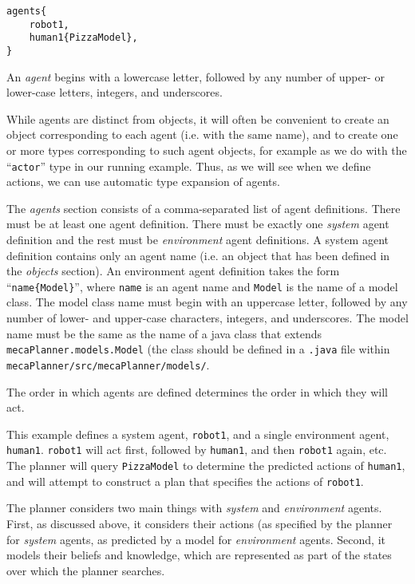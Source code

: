 \documentclass{article}
\begin{document}
\begin{verbatim}
agents{
    robot1,
    human1{PizzaModel},
}
\end{verbatim}


An \emph{agent}
begins with a lowercase letter, followed by any number of upper-
or lower-case letters, integers, and underscores.

While agents are distinct from objects, it will often be convenient 
to create an object corresponding to each agent (i.e. with the same name),
and to create one or more types corresponding to such agent objects, for example 
as we do with the ``\texttt{actor}'' type in our running example. Thus, as we
will see when we define actions, we can
use automatic type expansion of agents.

The \emph{agents} section consists of a comma-separated list of agent
definitions. There must be at least one agent definition. There must be exactly
one \emph{system} agent definition and the rest must be \emph{environment} agent
definitions. A system agent definition contains only an agent name (i.e. an
object that has been defined in the \emph{objects} section). An environment
agent definition takes the form ``\texttt{name\{Model\}}'', where \texttt{name}
is an agent name and \texttt{Model} is the name of a model class. The model
class name must begin with an uppercase letter, followed by any number of
lower- and upper-case characters, integers, and underscores. The model name must
be the same as the name of a java class that extends
\texttt{mecaPlanner.models.Model} (the class should be defined in a
\texttt{.java} file within \texttt{mecaPlanner/src/mecaPlanner/models/}.

The order in which agents are defined determines the order in which they will
act.

This example defines a system agent, \texttt{robot1}, and a single environment
agent, \texttt{human1}. \texttt{robot1} will act first, followed by
\texttt{human1}, and then \texttt{robot1} again, etc. The planner will query
\texttt{PizzaModel} to determine the predicted actions of \texttt{human1}, and
will attempt to construct a plan that specifies the actions of \texttt{robot1}.

The planner considers two main things with \emph{system} and \emph{environment}
agents. First, as discussed above, it considers their actions (as specified by
the planner for \emph{system} agents, as predicted by a model for
\emph{environment} agents. Second, it models their beliefs and knowledge, which
are represented as part of the states over which the planner searches.
\end{document}
